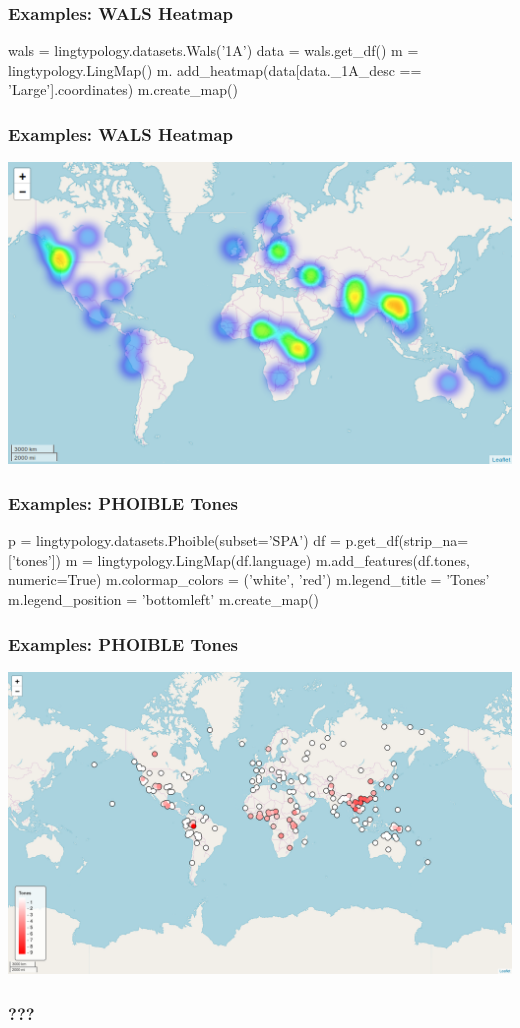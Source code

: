\documentclass{beamer}
\begin{document}
\begin{frame}[fragile]
\frametitle{Examples: WALS Heatmap}
\begin{python}
wals = lingtypology.datasets.Wals('1A')
data = wals.get_df()
m = lingtypology.LingMap()
m. add_heatmap(data[data._1A_desc == 'Large'].coordinates)
m.create_map()
\end{python}
\end{frame}

\begin{frame}
\frametitle{Examples: WALS Heatmap}
\includegraphics[width=\textwidth]{images/WalsHeatMap2.png}
\end{frame}

\begin{frame}[fragile]
\frametitle{Examples: PHOIBLE Tones}
\begin{python}
p = lingtypology.datasets.Phoible(subset='SPA')
df = p.get_df(strip_na=['tones'])
m = lingtypology.LingMap(df.language)
m.add_features(df.tones, numeric=True)
m.colormap_colors = ('white', 'red')
m.legend_title = 'Tones'
m.legend_position = 'bottomleft'
m.create_map()
\end{python}
\end{frame}

\begin{frame}
\frametitle{Examples: PHOIBLE Tones}
\includegraphics[width=\textwidth]{images/PHOIBLE.png}
\end{frame}

\begin{frame}
\frametitle{???}

\end{frame}
\end{document}
